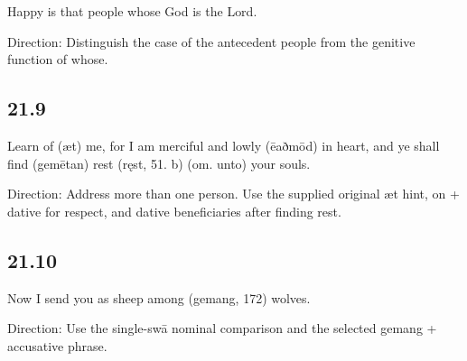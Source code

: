 \par\begin{minipage}{\linewidth}\raggedright
Happy is that people whose God is the Lord.

Direction: Distinguish the case of the antecedent people from the genitive function of whose.

\end{minipage}\par\addvspace{4pt}

\subsection*{21.9}

\par\begin{minipage}{\linewidth}\raggedright
Learn of (æt) me, for I am merciful and lowly (ēaðmōd) in heart, and ye shall find (gemētan) rest (ręst, 51. b) (om. unto) your souls.

Direction: Address more than one person. Use the supplied original æt hint, on + dative for respect, and dative beneficiaries after finding rest.

\end{minipage}\par\addvspace{4pt}

\subsection*{21.10}

\par\begin{minipage}{\linewidth}\raggedright
Now I send you as sheep among (gemang, 172) wolves.

Direction: Use the single-swā nominal comparison and the selected gemang + accusative phrase.

\end{minipage}\par\addvspace{4pt}

